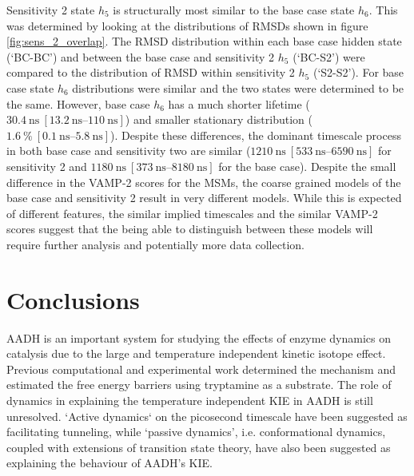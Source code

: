 Sensitivity 2 state $h_{5}$ is structurally most similar to the base case state $h_{6}$. This was determined by looking at the distributions of RMSDs shown in figure \ref{fig:sens_2_overlap}. The RMSD distribution within each base case hidden state (`BC-BC') and between the base case and sensitivity 2 $h_{5}$ (`BC-S2') were compared to the distribution of RMSD within sensitivity 2 $h_{5}$ (`S2-S2'). For base case state $h_{6}$ distributions were similar and the two states were determined to be the same.  However, base case $h_{6}$ has a much shorter lifetime ($\SI{30.4}{\nano\second}\ [\SIrange[range-phrase=--]{13.2}{110}{\nano\second}]$) and smaller stationary distribution ($\SI{1.6}{\percent}\ [\SIrange[range-phrase=--]{0.1}{5.8}{\nano\second}]$). Despite these differences, the dominant timescale process in both base case and sensitivity two are similar ($\SI{1210}{\nano\second}\ [\SIrange[range-phrase=--]{533}{6590}{\nano\second}]$ for sensitivity 2 and  $\SI{1180}{\nano\second}\ [\SIrange[range-phrase=--]{373}{8180}{\nano\second}]$ for the base case). Despite the small difference in the VAMP-2 scores for the MSMs, the coarse grained models of the base case and sensitivity 2 result in very different models. While this is expected of different features, the similar implied timescales  and the similar VAMP-2 scores suggest that the being able to distinguish between these models will require further analysis and potentially more data collection. 


\section{Conclusions}\label{sec:aadh_conclusions}
AADH is an important system for studying the effects of enzyme dynamics on catalysis due to the large and temperature independent kinetic isotope effect. Previous computational and experimental work determined the mechanism and estimated the free energy barriers using tryptamine as a substrate. The role of dynamics in explaining the temperature independent KIE in AADH is still unresolved. `Active dynamics` on the picosecond timescale have been suggested as facilitating tunneling, while  `passive dynamics', i.e. conformational dynamics, coupled with extensions of transition state theory, have also been suggested as explaining the behaviour of AADH's KIE. 

